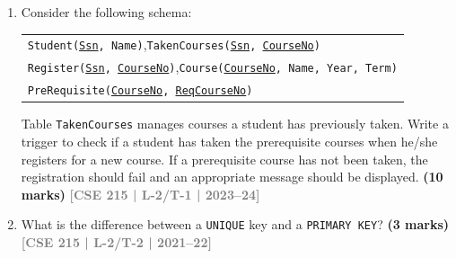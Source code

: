 \documentclass[12pt]{article}
\newcommand{\yr}[1]{\hfill\textcolor{gray}{\small\textbf{[#1]}}}
\newcommand{\mk}[1]{\textcolor{orange!70!black}{\small\textbf{(#1 marks)}}}
\begin{document}
\begin{enumerate}

\item Consider the following schema:
\begin{center}
\begin{tabular}{l}
\texttt{Student(\underline{Ssn}, Name)},\quad \texttt{TakenCourses(\underline{Ssn}, \underline{CourseNo})}\\
\texttt{Register(\underline{Ssn}, \underline{CourseNo})},\quad \texttt{Course(\underline{CourseNo}, Name, Year, Term)}\\
\texttt{PreRequisite(\underline{CourseNo}, \underline{ReqCourseNo})}
\end{tabular}
\end{center}
Table \texttt{TakenCourses} manages courses a student has previously taken. Write a trigger to check if a student has taken the prerequisite courses when he/she registers for a new course. If a prerequisite course has not been taken, the registration should fail and an appropriate message should be displayed.
\mk{10} \yr{CSE 215 | L-2/T-1 | 2023--24}


\item What is the difference between a \texttt{UNIQUE} key and a \texttt{PRIMARY KEY}?
\mk{3} \yr{CSE 215 | L-2/T-2 | 2021--22}



\end{enumerate}
\end{document}
